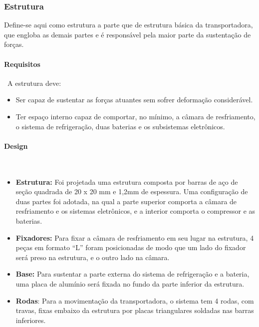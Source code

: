 \subsubsection{Estrutura}

Define-se aqui como estrutura a parte que de estrutura básica da transportadora, que engloba as demais partes e é responsável pela maior parte da sustentação de forças.

\paragraph*{Requisitos}\
A estrutura deve:
\begin{itemize}
\item Ser capaz de sustentar as forças atuantes sem sofrer deformação considerável.
\item Ter espaço interno capaz de comportar, no mínimo, a câmara de resfriamento, o sistema de refrigeração, duas baterias e os subsistemas eletrônicos.
\end{itemize}

\paragraph*{Design}\
\begin{itemize}
\item \textbf{Estrutura:} Foi projetada uma estrutura composta por barras de aço de seção quadrada de 20 x 20 mm e 1,2mm de espessura. Uma configuração de duas partes foi adotada, na qual a parte superior comporta a câmara de resfriamento e os sistemas eletrônicos, e a interior comporta o compressor e as baterias. 
\item \textbf{Fixadores:} Para fixar a câmara de resfriamento em seu lugar na estrutura, 4 peças em formato “L” foram posicionadas de modo que um lado do fixador será preso na estrutura, e o outro lado na câmara.
\item \textbf{Base:} Para sustentar a parte externa do sistema de refrigeração e a bateria, uma placa de alumínio será fixada no fundo da parte inferior da estrutura.
\item \textbf{Rodas}: Para a movimentação da transportadora, o sistema tem 4 rodas, com travas, fixas embaixo da estrutura por placas triangulares soldadas nas barras inferiores.
\end{itemize}

